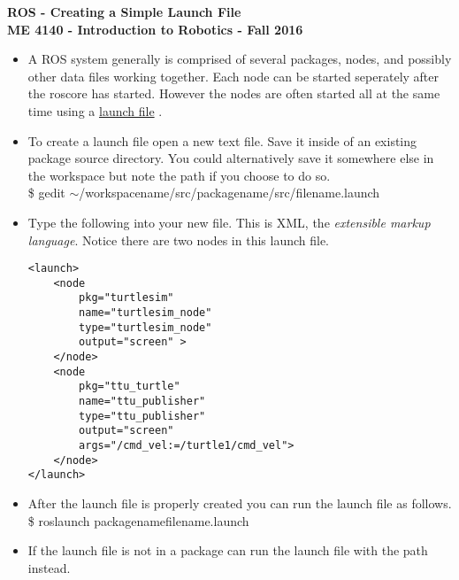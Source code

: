 \documentclass[12pt]{article}
\newcommand{\pkgname}{package\textunderscore name}
\newcommand{\wspname}{workspace\textunderscore name}
\newcommand{\lfname}{file\textunderscore name}
\begin{document}
\thispagestyle{plain}

\begin{center}
   {\bf \Large ROS - Creating a Simple Launch File}\vspace{2mm} \\
   {\bf \large ME 4140 - Introduction to Robotics - Fall 2016} \\
\end{center}


\begin{itemize}
	
	\item A ROS system generally is comprised of several packages, nodes, and possibly other data files working together. Each node can be started seperately after the roscore has started. However the nodes are often started all at the same time using a  \href{http://wiki.ros.org/roslaunch} {launch file} .

	\item To create a launch file open a new text file. Save it inside of an existing package source directory. You could alternatively save it somewhere else in the workspace but note the path if you choose to do so.\\
	
	{\selectfont  \hspace{5mm} \$ gedit $\sim$/\wspname/src/\pkgname/src/\lfname.launch }\\
	 
	\item Type the following into your new file. This is XML, the {\it extensible markup language}. Notice there are two nodes in this launch file.
\begin{lstlisting}
<launch>
	<node 
		pkg="turtlesim" 
		name="turtlesim_node" 
		type="turtlesim_node"
		output="screen" >	
	</node>
	<node 
		pkg="ttu_turtle"
		name="ttu_publisher"  
		type="ttu_publisher"
		output="screen" 
		args="/cmd_vel:=/turtle1/cmd_vel">	
	</node>		
</launch>
\end{lstlisting}

	\item After the launch file is properly created you can run the launch file as follows.\\

	{\selectfont  \hspace{5mm} \$ roslaunch \pkgname \hspace{3mm}\lfname.launch } \\

	\item If the launch file is not in a package can run the launch file with the path instead.\\


\end{itemize}
\end{document}
